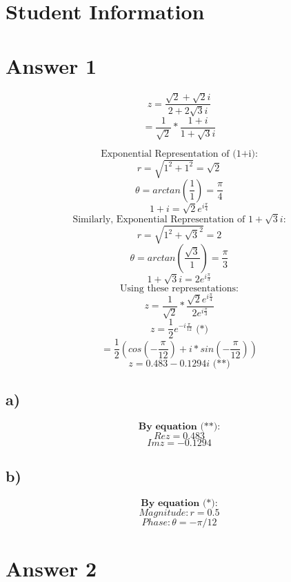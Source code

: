 \documentclass[12pt]{article}
\begin{document}
\section*{Student Information } 

\section*{Answer 1}
\[ z = \frac{ \sqrt{2} +  \sqrt{2}i }{2+2\sqrt{3}i} \]
\[= \frac{1}{\sqrt{2}} * \frac{1+i}{1 + \sqrt{3}i}\]

\[ \text{Exponential Representation of (1+i):}\]
\[ r = \sqrt{1^2 + 1^2} = \sqrt{2} \]
\[ \theta = arctan(\frac{1}{1}) = \frac{\pi}{4} \]
\[ 1+i = \sqrt{2}e^{i\frac{\pi}{4}  }\]
\[ \text{Similarly, Exponential Representation of } 1 + \sqrt{3}i \text{:}\]
\[ r = \sqrt{1^2 + \sqrt{3}^2} = 2 \]
\[ \theta = arctan(\frac{\sqrt{3}}{1}) = \frac{\pi}{3} \]
\[ 1+\sqrt{3}i  = 2e^{i\frac{\pi}{3}  }\]
\[ \text{Using these representations:}\]
\[z =  \frac{1}{ \sqrt{2} } *  \frac{\sqrt{2} e^{i \frac{\pi}{4}}}{ 2 e^{i \frac{\pi}{3}} } \]
\[z =  \frac{1}{ 2 } e^{-i\frac{\pi}{12}} \textbf{  (*)}\]
\[= \frac{1}{ 2 } (cos(-\frac{\pi}{12} ) + i*sin(-\frac{\pi}{12} ) )\]
\[z = 0.483 - 0.1294i\textbf{  (**)}\]


\subsection*{a)} 
\[\textbf{By equation (**):} \]
\[ Re{z} = 0.483\]
\[ Im{z} = -0.1294\]
\subsection*{b)} 
\[\textbf{By equation (*):} \]
\[ Magnitude : r = 0.5\]
\[ Phase : \theta = -\pi/12\]

\section*{Answer 2}
\end{document}
